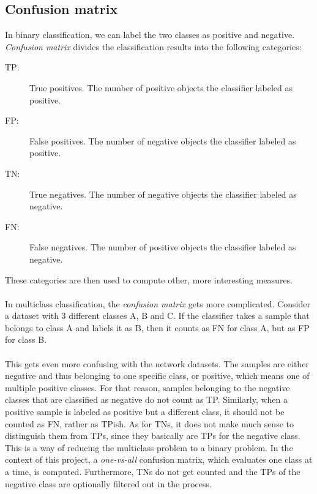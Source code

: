 \documentclass[11pt]{article}
\begin{document}
    \subsection{Confusion matrix}
      In binary classification, we can label the two classes as positive and negative. {\it Confusion matrix} divides the classification results into the following categories:
      \begin{description}
      \item [TP:]   True positives. The number of positive objects the classifier labeled as positive.
      \item [FP:]   False positives. The number of negative objects the classifier labeled as positive.
      \item [TN:]   True negatives. The number of negative objects the classifier labeled as negative.
      \item [FN:]   False negatives. The number of positive objects the classifier labeled as negative.
      \end{description}
      These categories are then used to compute other, more interesting measures.
      \\~\\
      In multiclass classification, the {\it confusion matrix} gets more complicated. Consider a dataset with 3 different classes A, B and C. If the classifier takes a sample that belongs to class A and labels it as B, then it counts as FN for class A, but as FP for class B.
      \\~\\
      This gets even more confusing with the network datasets. The samples are either negative and thus belonging to one specific class, or positive, which means one of multiple positive classes. For that reason, samples belonging to the negative classes that are classified as negative do not count as TP. Similarly, when a positive sample is labeled as positive but a different class, it should not be counted as FN, rather as TPish. As for TNs, it does not make much sense to distinguish them from TPs, since they basically are TPs for the negative class. This is a way of reducing the multiclass problem to a binary problem. In the context of this project, a {\it one-vs-all} confusion matrix, which evaluates one class at a time, is computed. Furthermore, TNs do not get counted and the TPs of the negative class are optionally filtered out in the process.
\end{document}
